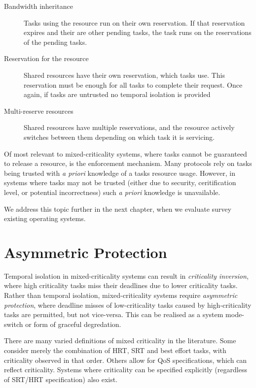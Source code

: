 \begin{description}
\item[Bandwidth inheritance] Tasks using the resource run on their own reservation.
If that reservation expires and their are other pending tasks, the task runs on the reservations of the pending tasks. 
\item[Reservation for the resource] Shared resources have their own reservation, which tasks use.
This reservation must be enough for all tasks to complete their request. 
Once again, if tasks are untrusted no temporal isolation is provided 
\item[Multi-reserve resources] Shared resources have multiple reservations, and the resource actively switches between them depending on which task it is servicing. 
\end{description} 

Of most relevant to mixed-criticality systems, where tasks cannot be guaranteed to release a resource, is the enforcement mechanism.
Many protocols rely on tasks being trusted with \emph{a priori} knowledge of a tasks resource usage. 
However, in systems where tasks may not be trusted (either due to security, ceritification level, or potential incorrectness) such \emph{a priori} knowledge is unavailable. 

We address this topic further in the next chapter, when we evaluate survey existing operating systems.

\section{Asymmetric Protection} 

Temporal isolation in mixed-criticality systems can result in \emph{criticality inversion}, where high criticality tasks miss their deadlines due to lower criticality tasks.
Rather than temporal isolation, mixed-criticality systems require \emph{asymmetric protection}, where deadline misses of low-criticality tasks caused by high-criticality tasks are permitted, but not vice-versa.
This can be realised as a system mode-switch or form of graceful degredation.

There are many varied definitions of mixed criticality in the literature.
Some consider merely the combination of \gls{HRT}, \gls{SRT} and best effort tasks, with criticality observed in that order.
Others allow for \gls{QoS} specifications, which can reflect criticality.
Systems where criticality can be specified explicitly (regardless of SRT/HRT specification) also exist.

